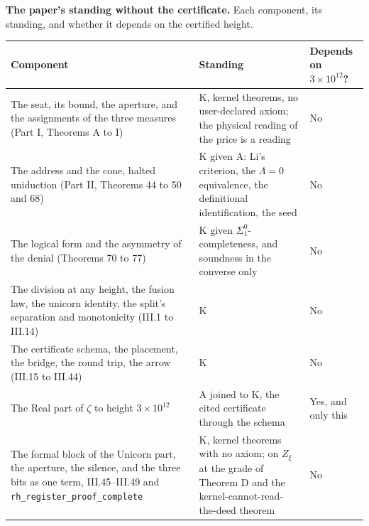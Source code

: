 \documentclass[10pt]{article}
\begin{document}
\begin{table}[!htbp]
\centering\small
\renewcommand{\arraystretch}{1.12}
\raggedright \textbf{The paper's standing without the certificate.} Each component, its standing, and whether it depends on the certified height.\par\smallskip
\begin{tabularx}{\textwidth}{@{}L P{0.30\textwidth} P{0.13\textwidth}@{}}
\toprule
\textbf{Component} & \textbf{Standing} & \textbf{Depends on $3 \times 10^{12}$?} \\
\midrule
The seat, its bound, the aperture, and the assignments of the three measures (Part I, Theorems A to I) & K, kernel theorems, no user-declared axiom; the physical reading of the price is a reading & No \\
The address and the cone, halted uniduction (Part II, Theorems 44 to 50 and 68) & K given A: Li's criterion, the $\Lambda = 0$ equivalence, the definitional identification, the seed & No \\
The logical form and the asymmetry of the denial (Theorems 70 to 77) & K given $\Sigma^0_1$-completeness, and soundness in the converse only & No \\
The division at any height, the fusion law, the unicorn identity, the split's separation and monotonicity (III.1 to III.14) & K & No \\
The certificate schema, the placement, the bridge, the round trip, the arrow (III.15 to III.44) & K & No \\
The Real part of $\zeta$ to height $3 \times 10^{12}$ & A joined to K, the cited certificate through the schema & Yes, and only this \\
The formal block of the Unicorn part, the aperture, the silence, and the three bits as one term, III.45--III.49 and \texttt{rh\_\allowbreak register\_\allowbreak proof\_\allowbreak complete} & K, kernel theorems with no axiom; on $Z_\xi$ at the grade of Theorem D and the kernel-cannot-read-the-deed theorem & No \\
\bottomrule
\end{tabularx}
\end{table}

\par\vspace{1.4em}\noindent{\color{accent}\rule{\columnwidth}{0.8pt}}\par{}\vspace{0.5em}\noindent{\color{accent}\rule{\columnwidth}{0.8pt}}\par\vspace{1.0em}
\end{document}
